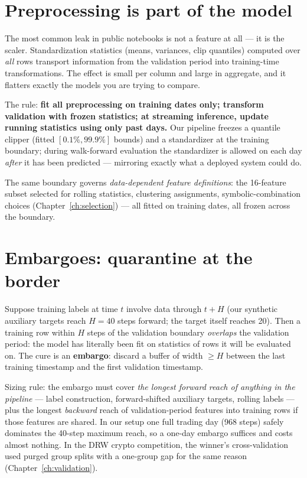 \section{Preprocessing is part of the model}

The most common leak in public notebooks is not a feature at all --- it is
the scaler. Standardization statistics (means, variances, clip quantiles)
computed over \emph{all} rows transport information from the validation
period into training-time transformations. The effect is small per column
and large in aggregate, and it flatters exactly the models you are trying
to compare.

The rule: \textbf{fit all preprocessing on training dates only; transform
validation with frozen statistics; at streaming inference, update running
statistics using only past days.} Our pipeline freezes a quantile clipper
(fitted $[0.1\%, 99.9\%]$ bounds) and a standardizer at the training
boundary; during walk-forward evaluation the standardizer is allowed
 on each day \emph{after} it has been predicted ---
mirroring exactly what a deployed system could do.

The same boundary governs \emph{data-dependent feature definitions}: the
16-feature subset selected for rolling statistics, clustering assignments,
symbolic-combination choices (Chapter~\ref{ch:selection}) --- all fitted on
training dates, all frozen across the boundary.

\section{Embargoes: quarantine at the border}
\label{sec:embargo}

Suppose training labels at time $t$ involve data through $t + H$ (our
synthetic auxiliary targets reach $H = 40$ steps forward; the target itself
reaches 20). Then a training row within $H$ steps of the validation
boundary \emph{overlaps} the validation period: the model has literally
been fit on statistics of rows it will be evaluated on. The cure is an
\textbf{embargo}: discard a buffer of width $\ge H$ between the last
training timestamp and the first validation timestamp.

Sizing rule: the embargo must cover \emph{the longest forward reach of
anything in the pipeline} --- label construction, forward-shifted auxiliary
targets, rolling labels --- plus the longest \emph{backward} reach of
validation-period features into training rows if those features are shared.
In our setup one full trading day (968 steps) safely dominates the 40-step
maximum reach, so a one-day embargo suffices and costs almost nothing. In
the DRW crypto competition, the winner's cross-validation used purged
group splits with a one-group gap for the same reason
(Chapter~\ref{ch:validation}).

